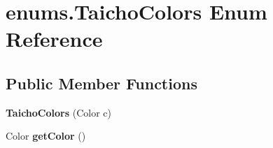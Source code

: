 \hypertarget{enumenums_1_1_taicho_colors}{\section{enums.\-Taicho\-Colors Enum Reference}
\label{enumenums_1_1_taicho_colors}
}
\subsection*{Public Member Functions}
\begin{DoxyCompactItemize}
\item 
\hypertarget{enumenums_1_1_taicho_colors_a66caebd4f2b81ec5c089521a61deef97}{{\bfseries Taicho\-Colors} (Color c)}\label{enumenums_1_1_taicho_colors_a66caebd4f2b81ec5c089521a61deef97}

\item 
\hypertarget{enumenums_1_1_taicho_colors_a9e632ef06e18b46325eab634c66a8107}{Color {\bfseries get\-Color} ()}\label{enumenums_1_1_taicho_colors_a9e632ef06e18b46325eab634c66a8107}

\end{DoxyCompactItemize}
